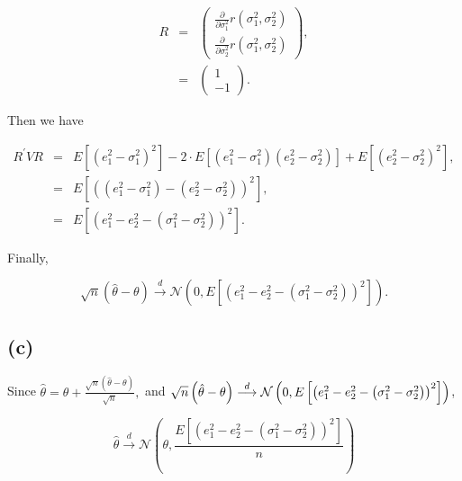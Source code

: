 \documentclass{article}
\begin{document}
\begin{eqnarray*}
R &=&\left( 
\begin{array}{c}
\frac{\partial }{\partial \sigma _{1}^{2}}r\left( \sigma _{1}^{2},\sigma
_{2}^{2}\right)  \\ 
\frac{\partial }{\partial \sigma _{2}^{2}}r\left( \sigma _{1}^{2},\sigma
_{2}^{2}\right) 
\end{array}%
\right) , \\
&=&\left( 
\begin{array}{c}
1 \\ 
-1%
\end{array}%
\right) .
\end{eqnarray*}

Then we have 

\begin{eqnarray*}
R^{\prime }VR &=&E\left[ \left( e_{1}^{2}-\sigma _{1}^{2}\right) ^{2}\right]
-2\cdot E\left[ \left( e_{1}^{2}-\sigma _{1}^{2}\right) \left(
e_{2}^{2}-\sigma _{2}^{2}\right) \right] +E\left[ \left( e_{2}^{2}-\sigma
_{2}^{2}\right) ^{2}\right] , \\
&=&E\left[ \left( \left( e_{1}^{2}-\sigma _{1}^{2}\right) -\left(
e_{2}^{2}-\sigma _{2}^{2}\right) \right) ^{2}\right] , \\
&=&E\left[ \left( e_{1}^{2}-e_{2}^{2}-\left( \sigma _{1}^{2}-\sigma
_{2}^{2}\right) \right) ^{2}\right] .
\end{eqnarray*}

Finally, 

\begin{equation*}
\sqrt{n}\left( \hat{\theta}-\theta \right) \overset{d}{\longrightarrow }%
\mathcal{N}\left( 0,E\left[ \left( e_{1}^{2}-e_{2}^{2}-\left( \sigma
_{1}^{2}-\sigma _{2}^{2}\right) \right) ^{2}\right] \right) .
\end{equation*}

\subsection*{(c)}

Since $\hat{\theta}=\theta +\frac{\sqrt{n}\left( \hat{\theta}-\theta \right) 
}{\sqrt{n}},$ and $\sqrt{n}\left( \hat{\theta}-\theta \right) \overset{d}{%
\longrightarrow }\mathcal{N}\left( 0,E\left[ \left(
e_{1}^{2}-e_{2}^{2}-\left( \sigma _{1}^{2}-\sigma _{2}^{2}\right) \right)
^{2}\right] \right) $,

\begin{equation*}
\hat{\theta}\overset{d}{\rightarrow }\mathcal{N}\left( \theta ,\frac{E\left[
\left( e_{1}^{2}-e_{2}^{2}-\left( \sigma _{1}^{2}-\sigma _{2}^{2}\right)
\right) ^{2}\right] }{n}\right) 
\end{equation*}
\end{document}
